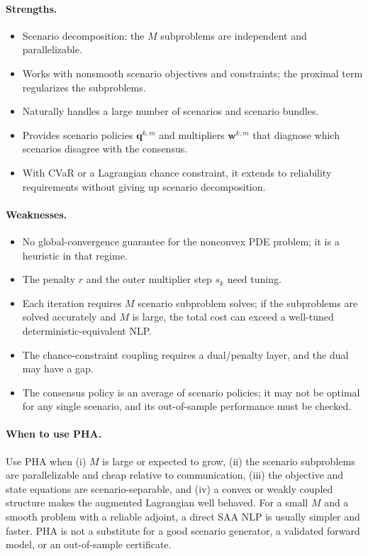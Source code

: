 \documentclass[11pt]{article}
\numberwithin{equation}{section}
\newcommand{\qq}{\mathbf{q}}
\newcommand{\ww}{\mathbf{w}}
\theoremstyle{plain}
\begin{document}
\paragraph{Strengths.}
\begin{itemize}[leftmargin=1.6em,itemsep=2pt]
  \item Scenario decomposition: the $M$ subproblems are independent and
        parallelizable.
  \item Works with nonsmooth scenario objectives and constraints; the
        proximal term regularizes the subproblems.
  \item Naturally handles a large number of scenarios and scenario bundles.
  \item Provides scenario policies $\qq^{k,m}$ and multipliers $\ww^{k,m}$
        that diagnose which scenarios disagree with the consensus.
  \item With CVaR or a Lagrangian chance constraint, it extends to reliability
        requirements without giving up scenario decomposition.
\end{itemize}

\paragraph{Weaknesses.}
\begin{itemize}[leftmargin=1.6em,itemsep=2pt]
  \item No global-convergence guarantee for the nonconvex PDE problem; it is a
        heuristic in that regime.
  \item The penalty $r$ and the outer multiplier step $s_k$ need tuning.
  \item Each iteration requires $M$ scenario subproblem solves; if the
        subproblems are solved accurately and $M$ is large, the total cost can
        exceed a well-tuned deterministic-equivalent NLP.
  \item The chance-constraint coupling requires a dual/penalty layer, and the
        dual may have a gap.
  \item The consensus policy is an average of scenario policies; it may not be
        optimal for any single scenario, and its out-of-sample performance must
        be checked.
\end{itemize}

\paragraph{When to use PHA.}
Use PHA when (i) $M$ is large or expected to grow, (ii) the scenario
subproblems are parallelizable and cheap relative to communication, (iii) the
objective and state equations are scenario-separable, and (iv) a convex or
weakly coupled structure makes the augmented Lagrangian well behaved.  For a
small $M$ and a smooth problem with a reliable adjoint, a direct SAA NLP is
usually simpler and faster.  PHA is not a substitute for a good scenario
generator, a validated forward model, or an out-of-sample certificate.
\end{document}
